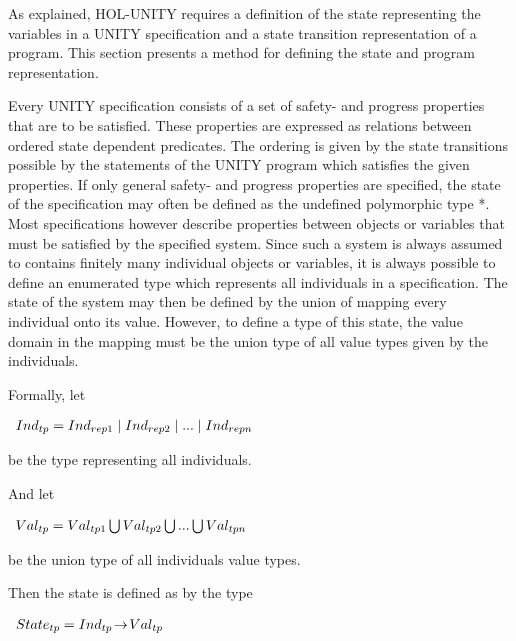 As explained, HOL-UNITY requires a definition of the state representing the
variables in a UNITY specification and a state transition representation of a
program.  This section presents a method for defining the state and program
representation.

Every UNITY specification consists of a set of safety- and progress properties
that are to be satisfied.  These properties are expressed as relations between
ordered state dependent predicates.  The ordering is given by the state
transitions possible by the statements of the UNITY program which satisfies the
given properties.  If only general safety- and progress properties are
specified, the state of the specification may often be defined as the undefined
polymorphic type *.  Most specifications however describe properties between
objects or variables that must be satisfied by the specified system.  Since
such a system is always assumed to contains finitely many individual objects or
variables, it is always possible to define an enumerated type which represents
all individuals in a specification.  The state of the system may then be
defined by the union of mapping every individual onto its value.  However, to
define a type of this state, the value domain in the mapping must be the union
type of all value types given by the individuals.

Formally, let

\vspace{2mm}
\centerline{\hbox{$ \it \begin{array}{l}
 Ind_{tp} = Ind_{rep1} \mid Ind_{rep2} \mid ... \mid Ind_{repn}
\end{array} $}}
\vspace{1mm}

be the type representing all individuals.

And let

\vspace{2mm}
\centerline{\hbox{$ \it \begin{array}{l}
  Val_{tp} = Val_{tp1} \bigcup Val_{tp2} \bigcup ... \bigcup Val_{tpn}
\end{array} $}}
\vspace{1mm}

be the union type of all individuals value types.

Then the state is defined as by the type

\vspace{2mm}
\centerline{\hbox{$ \it \begin{array}{l}
  State_{tp} = Ind_{tp}\!\rightarrow\!Val_{tp}
\end{array} $}}
\vspace{1mm}

